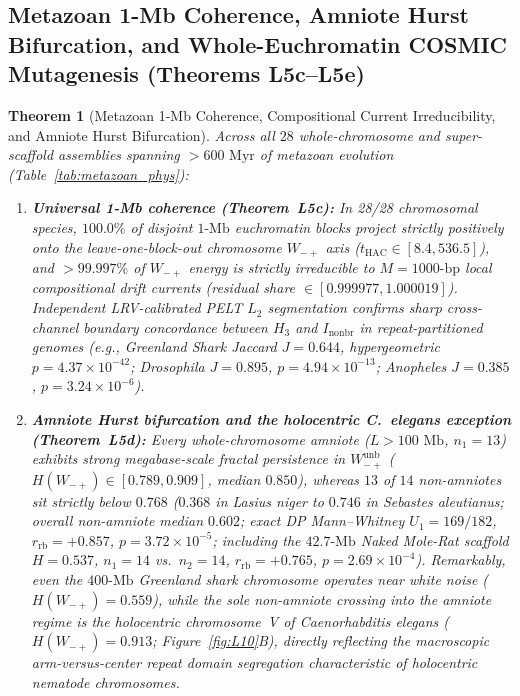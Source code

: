\documentclass[11pt,a4paper]{article}
\renewcommand{\_}{\origunderscore\penalty200\relax}
\newtheorem{theorem}{Theorem}[section]
\theoremstyle{remark}
\begin{document}
\subsection{Metazoan 1-Mb Coherence, Amniote Hurst Bifurcation, and Whole-Euchromatin COSMIC Mutagenesis (Theorems L5c--L5e)}
\begin{theorem}[Metazoan 1-Mb Coherence, Compositional Current Irreducibility, and Amniote Hurst Bifurcation]
\label{thm:L5cd}
Across all $28$ whole-chromosome and super-scaffold assemblies spanning $>600\text{ Myr}$ of metazoan evolution (Table~\ref{tab:metazoan_phys}):
\begin{enumerate}
  \item \textbf{Universal 1-Mb coherence (Theorem~L5c):} In 28/28 chromosomal species, $100.0\%$ of disjoint $1\text{-Mb}$ euchromatin blocks project strictly positively onto the leave-one-block-out chromosome $W_{-+}$ axis ($t_{\mathrm{HAC}} \in [8.4, 536.5]$), and $>99.997\%$ of $W_{-+}$ energy is strictly irreducible to $M=1000\text{-bp}$ local compositional drift currents (residual share $\in [0.999977, 1.000019]$). Independent LRV-calibrated PELT $L_2$ segmentation \cite{Killick2012} confirms sharp cross-channel boundary concordance between $H_3$ and $I_{\mathrm{nonbr}}$ in repeat-partitioned genomes (e.g., Greenland Shark Jaccard $J = 0.644$, hypergeometric $p = 4.37 \times 10^{-42}$; \textit{Drosophila} $J = 0.895$, $p = 4.94 \times 10^{-13}$; \textit{Anopheles} $J = 0.385$, $p = 3.24 \times 10^{-6}$).
  \item \textbf{Amniote Hurst bifurcation and the holocentric \textit{C.\ elegans} exception (Theorem~L5d):} Every whole-chromosome amniote ($L > 100\text{ Mb}$, $n_1=13$) exhibits strong megabase-scale fractal persistence in $W_{-+}^{\mathrm{unb}}$ ($H(W_{-+}) \in [0.789, 0.909]$, median $0.850$), whereas $13$ of $14$ non-amniotes sit strictly below $0.768$ ($0.368$ in \textit{Lasius niger} to $0.746$ in \textit{Sebastes aleutianus}; overall non-amniote median $0.602$; exact DP Mann--Whitney $U_1=169/182$, $r_{\mathrm{rb}} = +0.857$, $p = 3.72 \times 10^{-5}$; including the $42.7\text{-Mb}$ Naked Mole-Rat scaffold $H=0.537$, $n_1=14$ vs.\ $n_2=14$, $r_{\mathrm{rb}}=+0.765$, $p=2.69\times 10^{-4}$). Remarkably, even the $400\text{-Mb}$ Greenland shark chromosome operates near white noise ($H(W_{-+}) = 0.559$), while the sole non-amniote crossing into the amniote regime is the holocentric chromosome~V of \textit{Caenorhabditis elegans} ($H(W_{-+}) = 0.913$; Figure~\ref{fig:L10}B), directly reflecting the macroscopic arm-versus-center repeat domain segregation characteristic of holocentric nematode chromosomes.

\end{enumerate}
\end{theorem}
\end{document}
